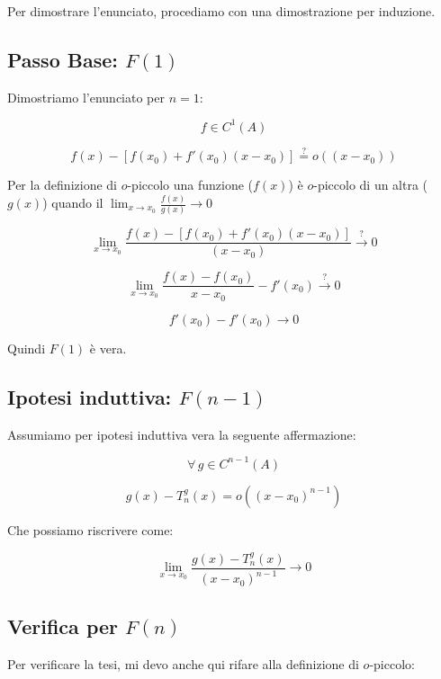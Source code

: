 \documentclass[../dimostrazioni]{subfiles}
\begin{document}
        Per dimostrare l'enunciato, procediamo con una dimostrazione per induzione.

        \medskip

        \subsection*{Passo Base: \(F(1)\)}

        Dimostriamo l'enunciato per \(n = 1\):
        
        \[  f \in C^1(A)  \]

        \[  f(x) - \left[ f(x_0) + f'(x_0)(x-x_0) \right] \stackrel{?}{=}  o ((x-x_0))  \]

        Per la definizione di \(o\)-piccolo una funzione (\(f(x)\)) è \(o\)-piccolo di un altra (\(g(x)\)) quando il \( \lim_{x \to x_0} \frac{f(x)}{g(x)} \rightarrow 0\) 
        
        \[    \lim_{x \to x_0} \frac{f(x) - \left[ f(x_0) + f'(x_0)(x-x_0) \right]}{(x-x_0)} \stackrel{?}{\rightarrow} 0 \]
            
        \[    \lim_{x \to x_0} \frac{f(x) - f(x_0)}{x - x_0} - f'(x_0) \stackrel{?}{\rightarrow} 0 \]

        \[    f'(x_0) - f'(x_0) \rightarrow 0 \]

        Quindi \(F(1)\) è vera. 

        \subsection*{Ipotesi induttiva: \(F(n-1)\)}

        Assumiamo per ipotesi induttiva vera la seguente affermazione:
        
        \[  \forall \, g \in C^{n-1} (A) \]

        \[  g(x) - T _n ^ g (x) = o ((x-x_0)^{n-1}) \]

        Che possiamo riscrivere come:

        \[  \lim_{x \to x_0} \frac{g(x) - T _n ^ g (x)}{(x-x_0)^{n-1}} \rightarrow 0 \]

        \subsection*{Verifica per \(F(n)\)}

        Per verificare la tesi, mi devo anche qui rifare alla definizione di \(o\)-piccolo:
        
\end{document}
